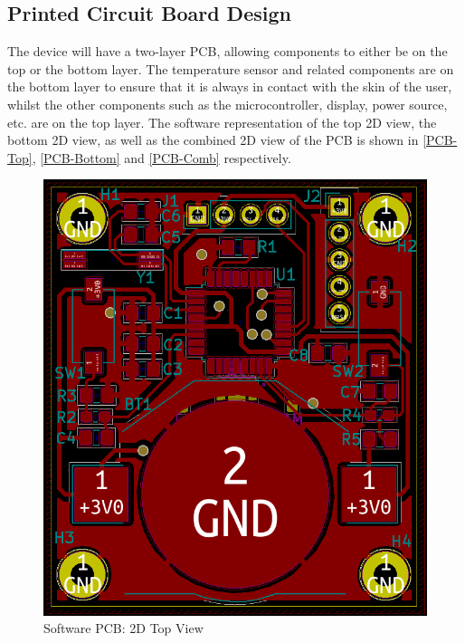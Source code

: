\subsection{Printed Circuit Board Design}
The device will have a two-layer PCB, allowing components to either be on the top or the bottom layer. The temperature sensor and related components are on the bottom layer to ensure that it is always in contact with the skin of the user, whilst the other components such as the microcontroller, display, power source, etc. are on the top layer. The software representation of the top 2D view, the bottom 2D view, as well as the combined 2D view of the PCB is shown in \autoref{PCB-Top}, \autoref{PCB-Bottom} and \autoref{PCB-Comb} respectively.
\begin{figure}[H]
	\centering
	\includegraphics[scale=0.4]{img/PCB-Top.PNG}
	\caption{Software PCB: 2D Top View}
	\label{PCB-Top}
\end{figure}
